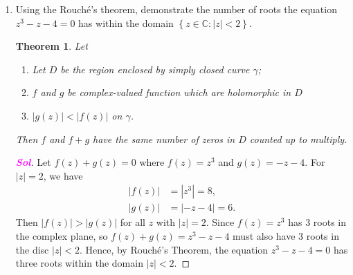 \documentclass{article}
\newtheorem*{theorem*}{Theorem}
\theoremstyle{definition}
\newcommand{\set}[1]{\left\{#1\right\}}
\newcommand{\C}{\mathbb{C}}
\newcommand{\of}[1]{\left( #1 \right)}
\newcommand{\abs}[1]{\left\lvert #1 \right\rvert}
\newcommand{\sol}{\textcolor{magenta}{\bf Sol}}
\newcommand{\res}{\operatorname{res}}
\begin{document}
\begin{enumerate}[\bf 1.]
\begin{proof}[\sol]
\begin{center}
		\end{center}
		\begin{align*}
			\int_{-\infty}^{\infty}\frac{x^2}{x^6+1}\ dx&=2\pi i\sum_{i=0}^3\res(f,w_i)\\
			&=2\pi i\cdot\frac{1}{6}\cdot\of{e^{-\frac{\pi}{2}i}+e^{-\frac{3\pi}{2}i}+e^{-\frac{5\pi}{2}i}}\\
			&=2\pi i\cdot\frac{1}{6}\cdot\of{(-i)+(i)+(-i)}\\
			&=\frac{\pi}{3}.
		\end{align*} Hence \[
		\int_0^{\infty}\frac{x^2}{x^6+1}\ dx=\frac{1}{2}\cdot\frac{\pi}{3}=\frac{\pi}{6}.
		\]
	\end{proof}
	\item 
	Using the Rouché's theorem, demonstrate the number of roots the equation $z^3 - z - 4 = 0$ has within the domain $\set{z\in\C:\abs{z}<2}.$ 
	\begin{tcolorbox}[colback=white,colframe=thmcolor,arc=5pt,title={\color{white}\bf Rouch\'{e}'s Theorem}]
		\begin{theorem*}
			Let \begin{enumerate}[(1)]
				\item Let $D$ be the region enclosed by simply closed curve $\gamma$;
				\item $f$ and $g$ be complex-valued function  which are holomorphic in $D$
				\item $\abs{g(z)}<\abs{f(z)}$ on $\gamma$.
			\end{enumerate} Then $f$ and $f+g$ have the same number of zeros in $D$ counted up to multiply.
	\end{theorem*}
	\end{tcolorbox}
	\begin{proof}[\sol]
		Let $f(z)+g(z)=0$ where $f(z)=z^3$ and $g(z)=-z-4$. For $\abs{z}=2$, we have \begin{align*}
			\abs{f(z)}&=\abs{z^3}=8,\\
			\abs{g(z)}&=\abs{-z-4}=6.
		\end{align*} Then $\abs{f(z)}>\abs{g(z)}$ for all $z$ with $\abs{z}=2$. Since $f(z)=z^3$ has 3 roots in the complex plane, so $f(z)+g(z)=z^3-z-4$ must also have 3 roots in the disc $\abs{z}<2$. Hence, by Rouch\'{e}'s Theorem, the equation $z^3-z-4=0$ has three roots within the domain $\abs{z}<2$. 

\end{proof}
\end{enumerate}
\end{document}
